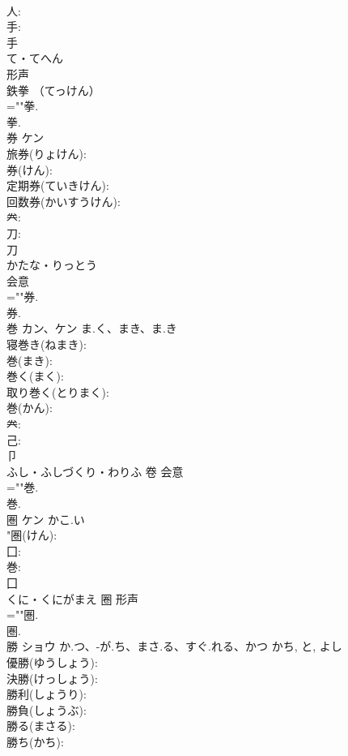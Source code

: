 \documentclass[8pt]{extreport}
\begin{document}
\begin{CJK}{UTF8}{min}
\\	人: 
\\	手: 
\\	手	
\\	て・てへん	
\\	形声 
\\	鉄拳 （てっけん） 
\\	=""拳.
\\	拳.
\\	券	ケン			
\\	旅券(りょけん): 
\\	券(けん): 
\\	定期券(ていきけん): 
\\	回数券(かいすうけん): 
\\	𠔉: 
\\	刀: 
\\	刀	
\\	かたな・りっとう	
\\	会意 
\\	=""券.
\\	券.
\\	巻	カン、ケン	ま.く、まき、ま.き		
\\	寝巻き(ねまき): 
\\	巻(まき): 
\\	巻く(まく): 
\\	取り巻く(とりまく): 
\\	巻(かん): 
\\	𠔉: 
\\	己: 
\\	卩	
\\	ふし・ふしづくり・わりふ	卷	会意 
\\	=""巻.
\\	巻.
\\	圏	ケン	かこ.い		
\\	"圏(けん): 
\\	囗: 
\\	巻: 
\\	囗	
\\	くに・くにがまえ	圈	形声 
\\	=""圏.
\\	圏.
\\	勝	ショウ	か.つ、-が.ち、まさ.る、すぐ.れる、かつ	かち, と, よし	
\\	優勝(ゆうしょう): 
\\	決勝(けっしょう): 
\\	勝利(しょうり): 
\\	勝負(しょうぶ): 
\\	勝る(まさる): 
\\	勝ち(かち): 

\end{CJK}
\end{document}
